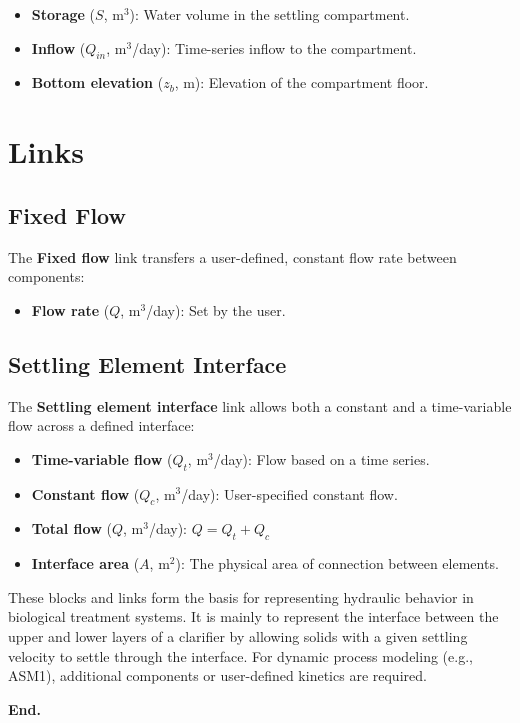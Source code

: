 \documentclass[12pt]{report}
\begin{document}
\begin{itemize}
\item \textbf{Storage} ($S$, m$^3$): Water volume in the settling compartment.
\item \textbf{Inflow} ($Q_{in}$, m$^3$/day): Time-series inflow to the compartment.
\item \textbf{Bottom elevation} ($z_b$, m): Elevation of the compartment floor.
\end{itemize}

\section{Links}
\subsection{Fixed Flow}
The \textbf{Fixed flow} link transfers a user-defined, constant flow rate between components:
\begin{itemize}
\item \textbf{Flow rate} ($Q$, m$^3$/day): Set by the user.
\end{itemize}

\subsection{Settling Element Interface}
The \textbf{Settling element interface} link allows both a constant and a time-variable flow across a defined interface:
\begin{itemize}
\item \textbf{Time-variable flow} ($Q_t$, m$^3$/day): Flow based on a time series.
\item \textbf{Constant flow} ($Q_c$, m$^3$/day): User-specified constant flow.
\item \textbf{Total flow} ($Q$, m$^3$/day): $Q = Q_t + Q_c$
\item \textbf{Interface area} ($A$, m$^2$): The physical area of connection between elements.
\end{itemize}

These blocks and links form the basis for representing hydraulic behavior in biological treatment systems. It is mainly to represent the interface between the upper and lower layers of a clarifier by allowing solids with a given settling velocity to settle through the interface. For dynamic process modeling (e.g., ASM1), additional components or user-defined kinetics are required.


\textbf{End.}


\end{document}
